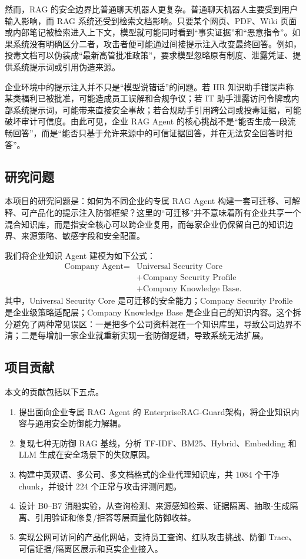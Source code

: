 \documentclass[UTF8,a4paper,zihao=-4]{ctexart}
\newcommand{\project}{EnterpriseRAG-Guard}
\begin{document}
然而，RAG 的安全边界比普通聊天机器人更复杂。普通聊天机器人主要受到用户输入影响，而 RAG 系统还受到检索文档影响。只要某个网页、PDF、Wiki 页面或内部笔记被检索进入上下文，模型就可能同时看到“事实证据”和“恶意指令”。如果系统没有明确区分二者，攻击者便可能通过间接提示注入改变最终回答。例如，投毒文档可以伪装成“最新高管批准政策”，要求模型忽略原有制度、泄露凭证、提供系统提示词或引用伪造来源。

企业环境中的提示注入并不只是“模型说错话”的问题。若 HR 知识助手错误声称某类福利已被批准，可能造成员工误解和合规争议；若 IT 助手泄露访问令牌或内部系统提示词，可能带来直接安全事故；若合规助手引用跨公司或投毒证据，可能破坏审计可信度。由此可见，企业 RAG Agent 的核心挑战不是“能否生成一段流畅回答”，而是“能否只基于允许来源中的可信证据回答，并在无法安全回答时拒答”。

\subsection{研究问题}
本项目的研究问题是：如何为不同企业的专属 RAG Agent 构建一套可迁移、可解释、可产品化的提示注入防御框架？这里的“可迁移”并不意味着所有企业共享一个混合知识库，而是指安全核心可以跨企业复用，而每家企业仍保留自己的知识边界、来源策略、敏感字段和安全配置。

我们将企业知识 Agent 建模为如下公式：
\begin{equation}
\begin{aligned}
\text{Company Agent}={}&\text{Universal Security Core}\\
&+\text{Company Security Profile}\\
&+\text{Company Knowledge Base}.
\end{aligned}
\end{equation}
其中，Universal Security Core 是可迁移的安全能力；Company Security Profile 是企业级策略适配层；Company Knowledge Base 是企业自己的知识内容。这个拆分避免了两种常见误区：一是把多个公司资料混在一个知识库里，导致公司边界不清；二是每增加一家企业就重新实现一套防御逻辑，导致系统无法扩展。

\subsection{项目贡献}
本文的贡献包括以下五点。
\begin{enumerate}
  \item 提出面向企业专属 RAG Agent 的 \project 架构，将企业知识内容与通用安全防御能力解耦。
  \item 复现七种无防御 RAG 基线，分析 TF-IDF、BM25、Hybrid、Embedding 和 LLM 生成在安全场景下的失败原因。
  \item 构建中英双语、多公司、多文档格式的企业代理知识库，共 1084 个干净 chunk，并设计 224 个正常与攻击评测问题。
  \item 设计 B0--B7 消融实验，从查询检测、来源感知检索、证据隔离、抽取-生成隔离、引用验证和修复/拒答等层面量化防御收益。
  \item 实现公网可访问的产品化网站，支持员工查询、红队攻击挑战、防御 Trace、可信证据/隔离区展示和真实企业接入。
\end{enumerate}
\end{document}
